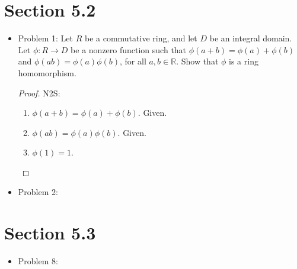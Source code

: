 \documentclass[hidelinks,12pt]{article}
\title{\scalebox{2}{Math 531 Homework 11}}
\author{\scalebox{1.5}{Theo Koss}}
\date{April 2021}
\newcommand{\R}{\mathbb{R}}
\begin{document}
\maketitle
\section{Section 5.2}
\begin{itemize}
\item Problem 1: Let $R$ be a commutative ring, and let $D$ be an integral domain. Let $\phi:R\to D$ be a nonzero function such that $\phi(a+b)=\phi(a)+\phi(b)$ and $\phi(ab)=\phi(a)\phi(b)$, for all $a,b\in\R$. Show that $\phi$ is a ring homomorphism.\begin{proof}N2S:\begin{enumerate}
    \item $\phi(a+b)=\phi(a)+\phi(b)$. Given.
    \item $\phi(ab)=\phi(a)\phi(b)$. Given.
    \item $\phi(1)=1$.
\end{enumerate}
\end{proof}
\item Problem 2:
\end{itemize}
\section{Section 5.3}
\begin{itemize}
    \item Problem 8:
\end{itemize}
\end{document}
